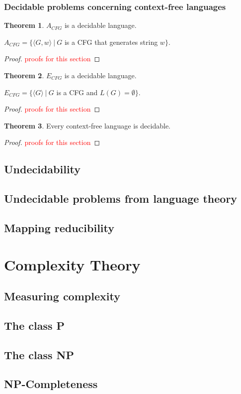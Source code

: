 \documentclass[11pt]{article}
\theoremstyle{definition}
\newtheorem{thm}{Theorem}[section]
\newcommand{\todo}{\textcolor{red}}
\begin{document}
\subsubsection{Decidable problems concerning context-free languages}
\begin{thm}
    $A_{CFG}$ is a decidable language.
    \begin{center}
        $A_{CFG} = \{\langle G,w\rangle\ |\ G$ is a CFG that generates string $w\}$.
    \end{center}
\end{thm}
\begin{proof}
    \todo{proofs for this section}
\end{proof}
\begin{thm}
    $E_{CFG}$ is a decidable language.
    \begin{center}
        $E_{CFG} = \{\langle G\rangle\ |\ G$ is a CFG and $L(G)=\emptyset\}$.
    \end{center}
\end{thm}
\begin{proof}
    \todo{proofs for this section}
\end{proof}
\begin{thm}
    Every context-free language is decidable.
\end{thm}
\begin{proof}
    \todo{proofs for this section}
\end{proof}
\subsection{Undecidability}
\subsection{Undecidable problems from language theory}
\subsection{Mapping reducibility}

\section{Complexity Theory}
\subsection{Measuring complexity}
\subsection{The class P}
\subsection{The class NP}
\subsection{NP-Completeness}
\end{document}
